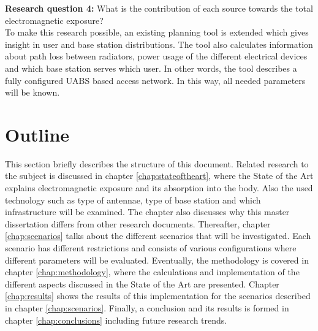 \textbf{Research question 4:} What is the contribution of each source towards the total electromagnetic exposure?\\

To make this research possible, an existing planning tool is extended which gives insight in user and base station distributions.
The tool also calculates information about path loss between radiators, power usage of the different electrical devices and which base station serves which user. In other words, the tool describes 
a fully configured \gls{UABS} based access network.
In this way, all needed parameters will be known.

\section{Outline}
\label{sec:structure}

This section briefly describes the structure of this document.
Related research to the subject is discussed in chapter  \ref{chap:stateoftheart}, where
 the State of the Art explains electromagnetic exposure and its absorption into the body.  
Also the used technology such as type of antennae, type of base station and which infrastructure will be examined. 
The chapter also discusses why this master dissertation differs from other research documents. 
Thereafter, chapter \ref{chap:scenarios} talks about the different scenarios that will be
investigated. Each scenario has different restrictions and consists of various configurations where different parameters will be evaluated.
 Eventually, the methodology is covered in chapter \ref{chap:methodology}, where the calculations and implementation 
 of the different aspects discussed in the State of the Art are presented. 
 Chapter \ref{chap:results} shows the results of this implementation for the scenarios described in chapter \ref{chap:scenarios}. 
 Finally, a conclusion and its results is formed in chapter \ref{chap:conclusions} including future research trends.